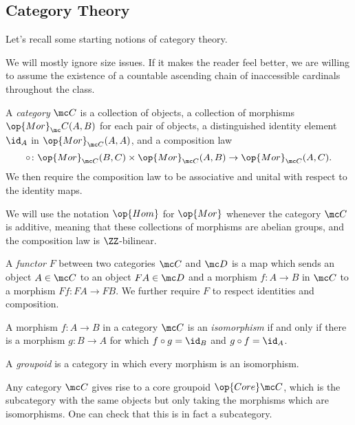 \documentclass[../notes.tex]{subfiles}
\begin{document}
\subsection{Category Theory}
Let's recall some starting notions of category theory.
\begin{warn}
	We will mostly ignore size issues. If it makes the reader feel better, we are willing to assume the existence of a countable ascending chain of inaccessible cardinals throughout the class.
\end{warn}
\begin{definition}[category]
	A \textit{category} $\mc C$ is a collection of objects, a collection of morphisms $\op{Mor}_\mc C(A,B)$ for each pair of objects, a distinguished identity element $\id_A$ in $\op{Mor}_{\mc C}(A,A)$, and a composition law
	\[\circ\colon\op{Mor}_{\mc C}(B,C)\times\op{Mor}_{\mc C}(A,B)\to\op{Mor}_{\mc C}(A,C).\]
	We then require the composition law to be associative and unital with respect to the identity maps.
\end{definition}
\begin{remark}
	We will use the notation $\op{Hom}$ for $\op{Mor}$ whenever the category $\mc C$ is additive, meaning that these collections of morphisms are abelian groups, and the composition law is $\ZZ$-bilinear.
\end{remark}
\begin{definition}[functor]
	A \textit{functor} $F$ between two categories $\mc C$ and $\mc D$ is a map which sends an object $A\in\mc C$ to an object $FA\in\mc D$ and a morphism $f\colon A\to B$ in $\mc C$ to a morphism $Ff\colon FA\to FB$. We further require $F$ to respect identities and composition.
\end{definition}
\begin{definition}[isomorphism]
	A morphism $f\colon A\to B$ in a category $\mc C$ is an \textit{isomorphism} if and only if there is a morphism $g\colon B\to A$ for which $f\circ g=\id_B$ and $g\circ f=\id_A$.
\end{definition}
\begin{definition}[groupoid]
	A \textit{groupoid} is a category in which every morphism is an isomorphism.
\end{definition}
\begin{example}
	Any category $\mc C$ gives rise to a core groupoid $\op{Core}\mc C$, which is the subcategory with the same objects but only taking the morphisms which are isomorphisms. One can check that this is in fact a subcategory.
\end{example}
\end{document}
